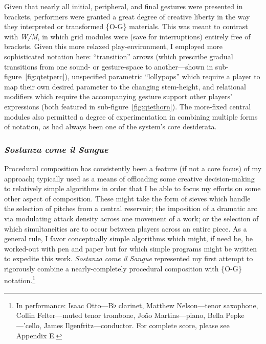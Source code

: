     Given that nearly all initial, peripheral, and final gestures were presented in brackets, performers were granted a great degree of creative liberty in the way they interpreted or transformed \{O-G\} materials. This was meant to contrast with \textit{W/M}, in which grid modules were (save for interruptions) entirely free of brackets. Given this more relaxed play-environment, I employed more sophisticated notation here: ``transition'' arrows (which prescribe gradual transitions from one sound- or gesture-space to another---shown in sub-figure~\ref{fig:qtetperc}), unspecified parametric ``lollypops'' which require a player to map their own desired parameter to the changing stem-height, and relational modifiers which require the accompanying gesture support other players' expressions (both featured in sub-figure~\ref{fig:qtethorn}). The more-fixed central modules also permitted a degree of experimentation in combining multiple forms of notation, as had always been one of the system's core desiderata.
    
    \subsubsection{\textit{Sostanza come il Sangue}}

    Procedural composition has consistently been a feature (if not a core focus) of my approach; typically used as a means of offloading some creative decision-making to relatively simple algorithms in order that I be able to focus my efforts on some other aspect of composition. These might take the form of sieves which handle the selection of pitches from a central reservoir; the imposition of a dramatic arc via modulating attack density across one movement of a work; or the selection of which simultaneities are to occur between players across an entire piece. As a general rule, I favor conceptually simple algorithms which might, if need be, be worked-out with pen and paper but for which simple programs might be written to expedite this work. \textit{Sostanza come il Sangue} represented my first attempt to rigorously combine a nearly-completely procedural composition with \{O-G\} notation.\footnote{In performance: Isaac Otto---B$\flat$ clarinet, Matthew Nelson---tenor saxophone, Collin Felter---muted tenor trombone, João Martins---piano, Bella Pepke---'cello, James Ilgenfritz---conductor. For complete score, please see Appendix E.}


